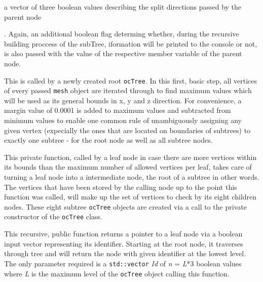 \begin{description}
\begin{enumerate*}
		\item a vector of three boolean values describing the split directions passed by the parent node
	\end{enumerate*}.
	Again, an additional boolean flag determing whether, during the recursive building proccess of the subTree, iformation will be printed to the console or not, is also passed with the value of the respective member variable of the parent node.
	\item[\texttt{getRootDimensions()}] This is called by a newly created root \texttt{ocTree}. In this first, basic step, all vertices of every passed \texttt{mesh} object are iterated through to find maximum values which will be used as its general bounds in x, y and z direction. For convenience, a margin value of 0.0001 is added to maximum values and subtracted from minimum values to enable one common rule of unambiguously assigning any given vertex (expecially the ones that are located on boundaries of subtrees) to exactly one subtree - for the root node as well as all subtree nodes.
	\item[\texttt{split()}] This private function, called by a leaf node in case there are more vertices within its bounds than the maximum number of allowed vertices per leaf, takes care of turning a leaf node into a intermediate node, the root of a subtree in other words. The vertices that have been stored by the calling node up to the point this function was called, will make up the set of vertices to check by its eight children nodes. These eight subtree \texttt{ocTree} objects are created via a call to the private constructor of the \texttt{ocTree} class.
	\item[\texttt{getNodeByIdentifierArray()}] This recursive, public function returns a pointer to a leaf node via a boolean input vector representing its identifier. Starting at the root node, it traverses through tree and will return the node with given identifier at the lowest level. The only parameter required is a \texttt{std::vector} \textit{Id} of \textit{n} = \textit{L}*3 boolean values where \textit{L} is the maximum level of the \texttt{ocTree} object calling this function.


\end{description}
